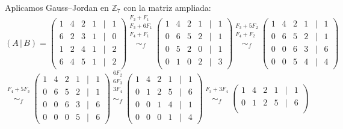 \documentclass[a4paper,12pt]{article}
\begin{document}
\begin{ejercicio}[title=Ejercicio 39]
Aplicamos Gauss--Jordan en $\mathbb{Z}_7$ con la matriz ampliada:
\[
(A\,|\,B)=
\begin{pmatrix}
1 & 4 & 2 & 1 &\Big|& 1\\
6 & 2 & 3 & 1 &\Big|& 0\\
1 & 2 & 4 & 1 &\Big|& 2\\
6 & 4 & 5 & 1 &\Big|& 2
\end{pmatrix}
\overset{\substack{F_2+F_1\\F_3+6F_1\\F_4+F_1\\{}}}{\sim_f}
\begin{pmatrix}
1 & 4 & 2 & 1 &\Big|& 1\\
0 & 6 & 5 & 2 &\Big|& 1\\
0 & 5 & 2 & 0 &\Big|& 1\\
0 & 1 & 0 & 2 &\Big|& 3
\end{pmatrix}
\overset{\substack{F_3+5F_2\\F_4+F_2\\{}}}{\sim_f}
\begin{pmatrix}
1 & 4 & 2 & 1 &\Big|& 1\\
0 & 6 & 5 & 2 &\Big|& 1\\
0 & 0 & 6 & 3 &\Big|& 6\\
0 & 0 & 5 & 4 &\Big|& 4
\end{pmatrix}
\]
\vspace{0.4em}
\[
\overset{\substack{F_4+5F_3\\{}}}{\sim_f}
\begin{pmatrix}
1 & 4 & 2 & 1 &\Big|& 1\\
0 & 6 & 5 & 2 &\Big|& 1\\
0 & 0 & 6 & 3 &\Big|& 6\\
0 & 0 & 0 & 5 &\Big|& 6
\end{pmatrix}
\overset{\substack{6F_2\\6F_3\\3F_4\\{}}}{\sim_f}
\begin{pmatrix}
1 & 4 & 2 & 1 &\Big|& 1\\
0 & 1 & 2 & 5 &\Big|& 6\\
0 & 0 & 1 & 4 &\Big|& 1\\
0 & 0 & 0 & 1 &\Big|& 4
\end{pmatrix}
\overset{\substack{F_3+3F_4\\{}}}{\sim_f}
\begin{pmatrix}
1 & 4 & 2 & 1 &\Big|& 1\\
0 & 1 & 2 & 5 &\Big|& 6\\

\end{pmatrix}\]
\end{ejercicio}
\end{document}
